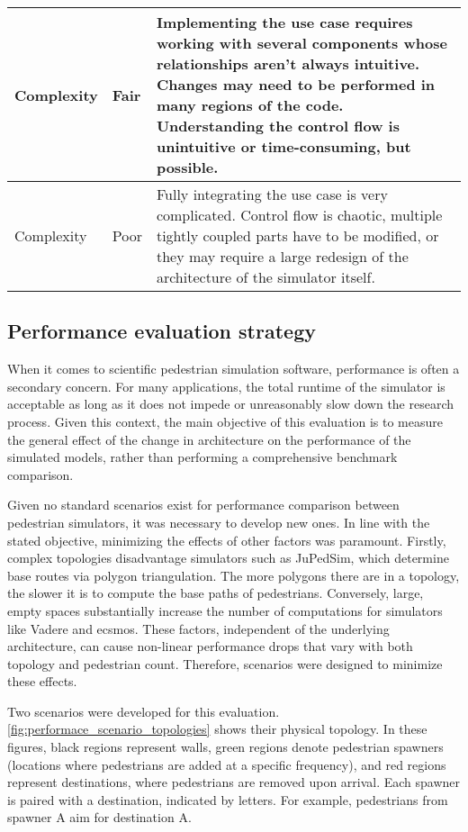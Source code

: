 \documentclass[twoside, 11pt]{article}
\begin{document}
\begin{center}
\begin{table}[h!]
\begin{tabularx}{\textwidth}{ | p{2.9cm} | l | X | }
      \hline
      Complexity & Fair & 
      Implementing the use case requires working with several components whose relationships aren't always intuitive. Changes may need to be performed in many regions of the code. Understanding the control flow is unintuitive or time-consuming, but possible.
      \\ 
      \hline
      Complexity & Poor & 
      Fully integrating the use case is very complicated. Control flow is chaotic, multiple tightly coupled parts have to be modified, or they may require a large redesign of the architecture of the simulator itself.
      \\ 
      \hline
    \end{tabularx}
    \label{table:qualitative-evaluation-criteria}
  \end{table}
\end{center}

\subsection{Performance evaluation strategy} \label{sec:performace-evaluation}

When it comes to scientific pedestrian simulation software, performance is often a secondary concern. For many applications, the total runtime of the simulator is acceptable as long as it does not impede or unreasonably slow down the research process. Given this context, the main objective of this evaluation is to measure the general effect of the change in architecture on the performance of the simulated models, rather than performing a comprehensive benchmark comparison.

Given no standard scenarios exist for performance comparison between pedestrian simulators, it was necessary to develop new ones. In line with the stated objective, minimizing the effects of other factors was paramount. Firstly, complex topologies disadvantage simulators such as JuPedSim, which determine base routes via polygon triangulation. The more polygons there are in a topology, the slower it is to compute the base paths of pedestrians. Conversely, large, empty spaces substantially increase the number of computations for simulators like Vadere and \gls{ecsmos}. These factors, independent of the underlying architecture, can cause non-linear performance drops that vary with both topology and pedestrian count. Therefore, scenarios were designed to minimize these effects.

Two scenarios were developed for this evaluation. \autoref{fig:performace_scenario_topologies} shows their physical topology. In these figures, black regions represent walls, green regions denote pedestrian spawners (locations where pedestrians are added at a specific frequency), and red regions represent destinations, where pedestrians are removed upon arrival. Each spawner is paired with a destination, indicated by letters. For example, pedestrians from spawner A aim for destination A.
\end{document}
